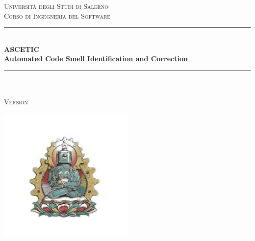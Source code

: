 	\begin{titlepage} %
		\newcommand{\HRule}{\rule{\linewidth}{0.5mm}} %
		
		\center %
		
		
		\textsc{\LARGE Università degli Studi di Salerno}\\
		\textsc{\large Corso di Ingegneria del Software}\\[1.5cm] %
		
		
		\HRule\\[0.4cm]
		
		{\huge\bfseries ASCETIC}\\ %
		\vspace{0.2cm}
		{\large\bfseries Automated Code Smell Identification and Correction}\\[0.2cm] %
		
		\HRule\\[1.5cm]
		
		\textsc{\Large \doctitle}\\[0.3cm] %
		
		\textsc{\large Version \docversion}\\[0.5cm] %
		
		
		
		\vfill\vfill
		
		\includegraphics[width=0.5\textwidth]{logo_temp.jpg}\\[1cm] %
		

\end{titlepage}
